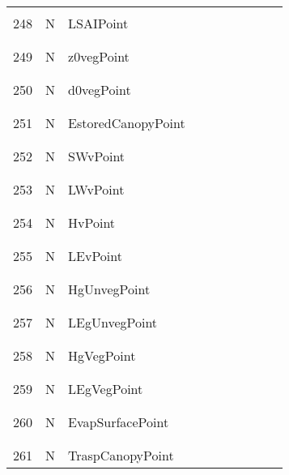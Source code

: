 \begin{longtable}{|c|c|l|c|c|c|c|p{}|c|p{}|}
&&&&&&&&&\\\hline%
&&&&&&&&&\\
248 & N & LSAIPoint & & & & & & & \\
&&&&&&&&&\\\hline%
&&&&&&&&&\\
249 & N & z0vegPoint & & & & & & & \\
&&&&&&&&&\\\hline%
&&&&&&&&&\\
250 & N & d0vegPoint & & & & & & & \\
&&&&&&&&&\\\hline%
&&&&&&&&&\\
251 & N & EstoredCanopyPoint & & & & & & & \\
&&&&&&&&&\\\hline%
&&&&&&&&&\\
252 & N & SWvPoint & & & & & & & \\
&&&&&&&&&\\\hline%
&&&&&&&&&\\
253 & N & LWvPoint & & & & & & & \\
&&&&&&&&&\\\hline%
&&&&&&&&&\\
254 & N & HvPoint & & & & & & & \\
&&&&&&&&&\\\hline%
&&&&&&&&&\\
255 & N & LEvPoint & & & & & & & \\
&&&&&&&&&\\\hline%
&&&&&&&&&\\
256 & N & HgUnvegPoint & & & & & & & \\
&&&&&&&&&\\\hline%
&&&&&&&&&\\
257 & N & LEgUnvegPoint & & & & & & & \\
&&&&&&&&&\\\hline%
&&&&&&&&&\\
258 & N & HgVegPoint & & & & & & & \\
&&&&&&&&&\\\hline%
&&&&&&&&&\\
259 & N & LEgVegPoint & & & & & & & \\
&&&&&&&&&\\\hline%
&&&&&&&&&\\
260 & N & EvapSurfacePoint & & & & & & & \\
&&&&&&&&&\\\hline%
&&&&&&&&&\\
261 & N & TraspCanopyPoint & & & & & & & \\

\end{longtable}
